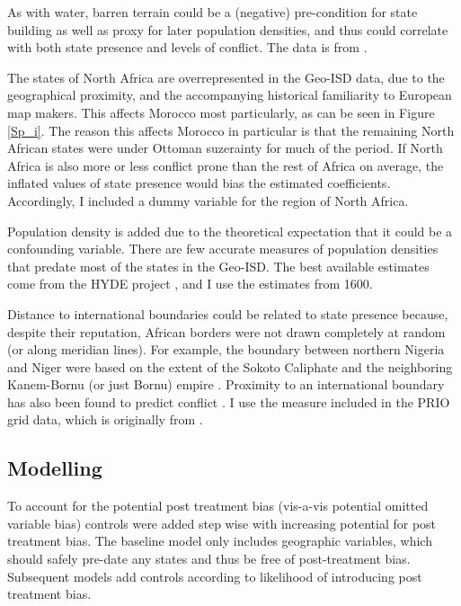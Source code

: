 \documentclass[12pt]{article}
\begin{document}
As with water, barren terrain could be a (negative) pre-condition for state
building as well as proxy for later population densities, and thus could
correlate with both state presence and levels of conflict. The data is from
\citet{Bontemps2009}.

The states of North Africa are overrepresented in the Geo-ISD data, due to the
geographical proximity, and the accompanying historical familiarity to European
map makers. This affects Morocco most particularly, as can be seen in Figure
\ref{Sp_i}. The reason this affects Morocco in particular is that the remaining
North African states were under Ottoman suzerainty for much of the period. If
North Africa is also more or less conflict prone than the rest of Africa on
average, the inflated values of state presence would bias the estimated
coefficients. Accordingly, I included a dummy variable for the region of North
Africa.

Population density is added due to the theoretical expectation that it could be
a confounding variable. There are few accurate measures of population densities
that predate most of the states in the Geo-ISD. The best available estimates
come from the HYDE project \citep{Goldewijk2016}, and I use the estimates from
1600.

Distance to international boundaries could be related to state presence because,
despite their reputation, African borders were not drawn completely at random
(or along meridian lines). For example, the boundary between northern Nigeria and
Niger were based on the extent of the Sokoto Caliphate and the neighboring
Kanem-Bornu (or just Bornu) empire \citep{HiribarrenVincent2017AHoB}. Proximity
to an international boundary has also been found to predict conflict
\citep{Buhaug2002}. I use the measure included in the PRIO grid data, which is
originally from \citet{Weidmann2010a}.


\subsection{Modelling} \label{Modelling}

To account for the potential post treatment bias (vis-a-vis potential omitted
variable bias) controls were added step wise with increasing potential for post
treatment bias. The baseline model only includes geographic variables, which
should safely pre-date any states and thus be free of post-treatment bias.
Subsequent models add controls according to likelihood of introducing post
treatment bias.
\end{document}
